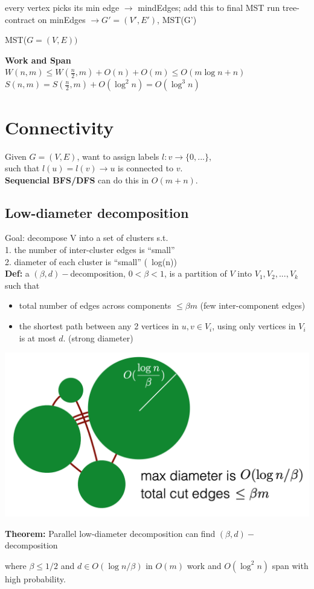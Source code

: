 \documentclass[12pt]{article}
\begin{document}
\begin{algorithm}[H]
\SetAlgoLined
 every vertex picks its min edge $\rightarrow$ mindEdges; add this to final MST
 run tree-contract on minEdges $\rightarrow G' = (V', E')$, 
 MST(G') 
 \caption{MST($G = (V,E))$}
\end{algorithm}
\textbf{Work and Span}\\
$W(n, m) \leq W(\frac{n}{2}, m) + O(n) + O(m) \leq O(m \log n +n)$\\
$S(n,m) = S(\frac{n}{2}, m) + O(\log^2 n) = O(\log ^3 n)$

\section{Connectivity}
Given $G = (V, E)$, want to assign labels $l: v \rightarrow \{0,...\}$, \\
such that $l(u) = l(v) \rightarrow u$ is connected to $v$.\\

\textbf{Sequencial BFS/DFS }can do this in $O(m+n)$.

\subsection{Low-diameter decomposition}
Goal: decompose V into a set of clusters s.t.\\
	1. the number of inter-cluster edges is “small”\\
	2. diameter of each cluster is “small” (~log(n)) \\
	
\textbf{Def: } a $(\beta,d)-$decomposition, $0 < \beta < 1$, is a partition of $V$ into $V_1, V_2, ..., V_k$ such that
\begin{itemize}
	\item total number of edges across components $\leq \beta m$ (few inter-component edges)
	\item the shortest path between any 2 vertices in  $u, v \in V_i$, using only vertices in $V_i$ is at most $d$. (strong diameter) 
\end{itemize}
	
\includegraphics[scale=0.5]{mpx}

\textbf{Theorem: } Parallel low-diameter decomposition can find $(\beta, d)-$ decomposition 

where  $\beta \leq 1/2$ and $d \in O(\log n/\beta)$ in $O(m)$ work and $O(\log ^2n)$ span with high probability.
\end{document}
